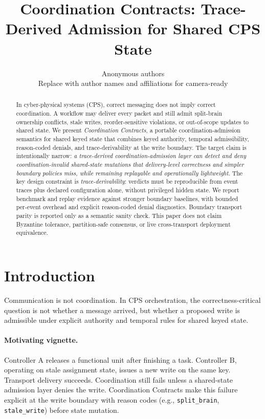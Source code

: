 \documentclass[11pt]{article}
\title{\textbf{Coordination Contracts: Trace-Derived Admission for Shared CPS State}}
\author{Anonymous authors\\
\small Replace with author names and affiliations for camera-ready}
\date{}
\newcommand{\nongoals}{This paper does not claim Byzantine tolerance, partition-safe consensus, or live cross-transport deployment equivalence.}
\begin{document}
\maketitle

\begin{abstract}
In cyber-physical systems (CPS), correct messaging does not imply correct coordination. A workflow may deliver every packet and still admit split-brain ownership conflicts, stale writes, reorder-sensitive violations, or out-of-scope updates to shared state. We present \emph{Coordination Contracts}, a portable coordination-admission semantics for shared keyed state that combines keyed authority, temporal admissibility, reason-coded denials, and trace-derivability at the write boundary. The target claim is intentionally narrow: \emph{a trace-derived coordination-admission layer can detect and deny coordination-invalid shared-state mutations that delivery-level correctness and simpler boundary policies miss, while remaining replayable and operationally lightweight}. The key design constraint is \emph{trace-derivability}: verdicts must be reproducible from event traces plus declared configuration alone, without privileged hidden state. We report benchmark and replay evidence against stronger boundary baselines, with bounded per-event overhead and explicit reason-coded denial diagnostics. Boundary transport parity is reported only as a semantic sanity check. \nongoals
\end{abstract}

\section{Introduction}

Communication is not coordination. In CPS orchestration, the correctness-critical question is not whether a message arrived, but whether a proposed write is admissible under explicit authority and temporal rules for shared keyed state.

\paragraph{Motivating vignette.}
Controller A releases a functional unit after finishing a task. Controller B, operating on stale assignment state, issues a new write on the same key. Transport delivery succeeds. Coordination still fails unless a shared-state admission layer denies the write. Coordination Contracts make this failure explicit at the write boundary with reason codes (e.g., \texttt{split\_brain}, \texttt{stale\_write}) before state mutation.
\end{document}
